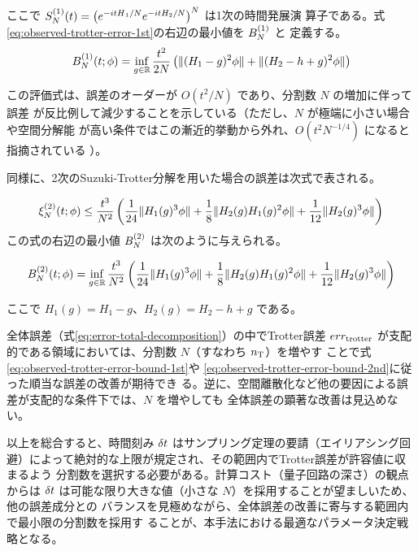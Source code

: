 \documentclass[wabun2025.tex]{subfiles}
\begin{document}
ここで $S_{N}^{(1)}(t) = \left(e^{-i{tH}_1/N}e^{-itH_2/N}\right)^N$ は1次の時間発展演
算子である。式\eqref{eq:observed-trotter-error-1st}の右辺の最小値を $B_{N}^{(1)}$ と
定義する。
\begin{equation}
B_{N}^{(1)}(t;\phi)=\inf_{g\in\mathbb{R}}\frac{t^2}{2N}
    \left(\|(H_1-g)^2\phi\|+\|(H_2-h+g)^2\phi\|\right)
\label{eq:observed-trotter-error-bound-1st}
\end{equation}

この評価式は、誤差のオーダーが $O(t^2/N)$ であり、分割数 $N$ の増加に伴って誤差
が反比例して減少することを示している（ただし、$N$ が極端に小さい場合や空間分解能
が高い条件ではこの漸近的挙動から外れ、$O(t^2 N^{-1/4})$ になると指摘されている
\cite{Burgarth2024.PhysRevResearch.6.043155}）。

同様に、2次のSuzuki-Trotter分解を用いた場合の誤差は次式で表される。

\begin{equation}
  \xi_{N}^{(2)}(t;\phi)\leq\frac{t^3}{N^2}\left(\frac{1}{24}\|H_1(g)^3\phi\| + \frac{1}{8}\|H_2(g)H_1(g)^2\phi\|
  +\frac{1}{12}\|H_2(g)^3\phi\|\right)
    \label{eq:observed-trotter-error-2nd}
\end{equation}
この式の右辺の最小値 $B_{N}^{(2)}$ は次のように与えられる。

\begin{equation}
B_{N}^{(2)}(t;\phi)=\inf_{g\in\mathbb{R}}\frac{t^3}{N^2}
    \left(\frac{1}{24}\|H_1(g)^3\phi\| + \frac{1}{8}\|H_2(g)H_1(g)^2\phi\|
  +\frac{1}{12}\|H_2(g)^3\phi\|\right)
\label{eq:observed-trotter-error-bound-2nd}
\end{equation}

ここで $H_1(g) = H_1-g$、$H_2(g) = H_2-h+g$ である。

全体誤差（式\eqref{eq:error-total-decomposition}）の中でTrotter誤差
$err_{\mathrm{trotter}}$ が支配的である領域においては、分割数 $N$（すなわち $n_{\mathrm{T}}$）を増やす
ことで式\eqref{eq:observed-trotter-error-bound-1st}や
\eqref{eq:observed-trotter-error-bound-2nd}に従った順当な誤差の改善が期待でき
る。逆に、空間離散化など他の要因による誤差が支配的な条件下では、$N$ を増やしても
全体誤差の顕著な改善は見込めない。


以上を総合すると、時間刻み $\delta t$ はサンプリング定理の要請（エイリアシング回
避）によって絶対的な上限が規定され、その範囲内でTrotter誤差が許容値に収まるよう
分割数を選択する必要がある。計算コスト（量子回路の深さ）の観点からは $\delta t$
は可能な限り大きな値（小さな $N$）を採用することが望ましいため、他の誤差成分との
バランスを見極めながら、全体誤差の改善に寄与する範囲内で最小限の分割数を採用す
ることが、本手法における最適なパラメータ決定戦略となる。
\end{document}
